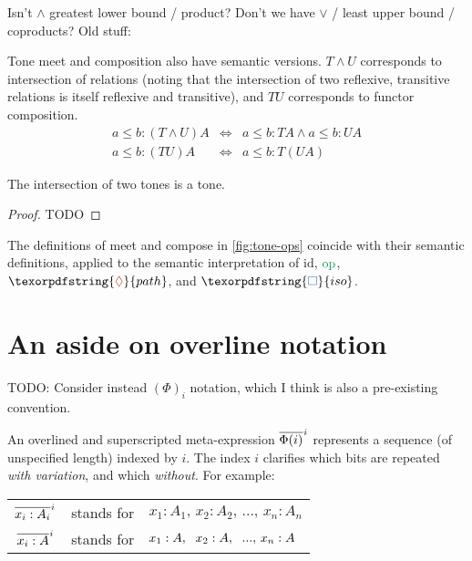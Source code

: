 \documentclass[ribbons]{rntz}
\newcommand{\todo}[1]{{\color{Purple}#1}}
\newcommand\opcolor{\color{ForestGreen}}
\newcommand\isocolor{\color{NavyBlue}}
\newcommand\pathcolor{\color{Bittersweet}}
\newcommand\id{\ensuremath{\mathrm{id}}}
\newcommand\op{\ensuremath{\mathrm{\opcolor op}}}
\newcommand\iso{\texorpdfstring{\ensuremath{{\isocolor\Box}}}{iso}}
\renewcommand\path{\texorpdfstring{\ensuremath{{\pathcolor\lozenge}}}{path}}
\newcommand\tmeet{\wedge}                  %
\begin{document}
\todo{Isn't $\tmeet$ greatest lower bound / product? Don't we have
  $\vee$ / least upper bound / coproducts? Old stuff:}

Tone meet and composition also have semantic versions. $T \tmeet U$ corresponds
to intersection of relations (noting that the intersection of two reflexive,
transitive relations is itself reflexive and transitive), and $TU$ corresponds
to functor composition.
%
\begin{eqnarray*}
  a \le b : (T \tmeet U)A %
  &\iff& a \le b : TA \wedge a \le b : UA\\
  a \le b : (TU)A &\iff& a \le b : T(UA)
\end{eqnarray*}

\begin{conjecture}
  The intersection of two tones is a tone.
\end{conjecture}
\begin{proof}
  \todo{TODO}
\end{proof}

\begin{conjecture}
  The definitions of meet and compose in \cref{fig:tone-ops} coincide with their
  semantic definitions, applied to the semantic interpretation of $\id$, $\op$,
  $\path$, and $\iso$.
\end{conjecture}


\section{An aside on overline notation}

\newcommand{\xbar}[2]{\overline{#2}^{\hspace{.5pt}#1}}

\newcommand{\Expr}{\Phi}
\newcommand{\Ix}[1]{#1}
\newcommand{\Ex}{{x}}
\newcommand{\Ay}{{A}}

\todo{TODO: Consider instead $\left(\Expr\right)_i$ notation, which I think is
  also a pre-existing convention.}

An overlined and superscripted meta-expression $\xbar{i}{\Expr(i)}$ represents a
sequence (of unspecified length) indexed by $i$. The index $i$ clarifies which
bits are repeated \emph{with variation}, and which \emph{without}. For example:

\begin{center}
  \begin{tabular}{ccl}
    $\xbar{\Ix{i}}{\Ex_{\Ix{i}} : \Ay_{\Ix{i}}}$
    & stands for
    & $\Ex_{\Ix{1}} : \Ay_{\Ix{1}},\, \Ex_{\Ix{2}} : \Ay_{\Ix{2}},\, ...,\, \Ex_{\Ix{n}} : \Ay_{\Ix{n}}$
    \vspace{.5em}\\
    $\xbar{\Ix{i}}{\Ex_{\Ix{i}} : \Ay}$
    & stands for
    & $\Ex_{\Ix{1}} : \Ay,\hspace{0.6em} \Ex_{\Ix{2}} : \Ay,\hspace{0.6em} ...,\, \Ex_{\Ix{n}} : \Ay$
  \end{tabular}
\end{center}
\end{document}
